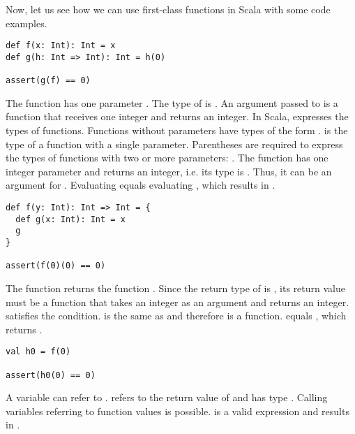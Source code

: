 Now, let us see how we can use first-class functions in Scala with some code
examples.

\begin{verbatim}
def f(x: Int): Int = x
def g(h: Int => Int): Int = h(0)

assert(g(f) == 0)
\end{verbatim}

The function  has one parameter . The type of  is .
An argument passed to  is a function that receives one integer
and returns an integer. In Scala, \code{=>} expresses the types
of functions. Functions without parameters have types of the form .
 is the type of a function with a
single parameter. Parentheses are required to express the types of functions
with two or more parameters:
. The function 
has one integer parameter and returns an integer, i.e. its type is . Thus, it can be an argument for
. Evaluating  equals evaluating , which results
in .

\begin{verbatim}
def f(y: Int): Int => Int = {
  def g(x: Int): Int = x
  g
}

assert(f(0)(0) == 0)
\end{verbatim}

The function  returns the function . Since the return type of 
is , its return value must be a function that takes an integer
as an argument and returns an integer.  satisfies the condition. 
is the same as  and therefore is a function.  equals ,
which returns .

\begin{verbatim}
val h0 = f(0)

assert(h0(0) == 0)
\end{verbatim}

A variable can refer to .  refers to the return value of
 and has type . Calling variables referring to
function values is possible.  is a valid expression and results in
.

